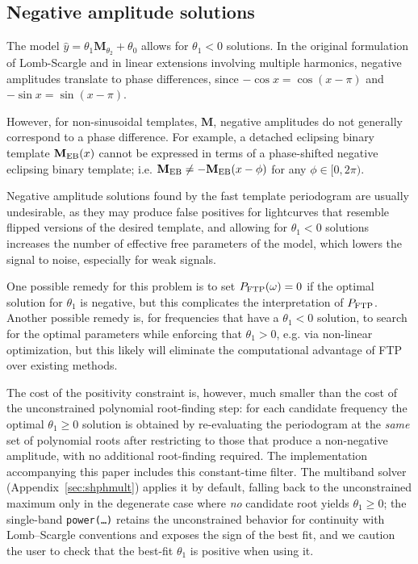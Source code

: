 \documentclass[apj]{emulateapj}
\newcommand{\Mshft}{\mathbf{M}_{\theta_2}}
\begin{document}
\subsection{Negative amplitude solutions}
The model $\hat{y}= \theta_1\Mshft + \theta_0$ allows for $\theta_1 < 0$ solutions.
In the original formulation of Lomb-Scargle and in linear
extensions involving multiple harmonics, negative amplitudes translate to
phase differences, since $-\cos{x} = \cos(x - \pi)$ and $-\sin{x} = \sin(x - \pi)$.

However, for non-sinusoidal templates, $\mathbf{M}$, negative amplitudes
do not generally correspond to a phase difference. For example, a
detached eclipsing binary template $\mathbf{M}_{\rm EB}(x)$ cannot be
expressed in terms of a phase-shifted negative eclipsing binary template; i.e.
$\mathbf{M}_{\rm EB} \neq - \mathbf{M}_{\rm EB}(x - \phi)$ for any $\phi\in[0, 2\pi)$.

Negative amplitude solutions found by the fast template periodogram are usually
undesirable, as they may produce false positives for lightcurves that resemble
flipped versions of the desired template, and allowing for $\theta_1 < 0$ solutions
increases the number of effective free parameters of the model, which lowers
the signal to noise, especially for weak signals.

One possible remedy for this problem is to set $P_{\rm FTP}(\omega) = 0$ if the optimal
solution for $\theta_1$ is negative, but this complicates the interpretation of $P_{\rm FTP}$.
Another possible remedy is, for frequencies that have a $\theta_1 < 0$ solution,
to search for the optimal parameters while enforcing that $\theta_1 > 0$,
e.g. via non-linear optimization, but this likely will eliminate the computational
advantage of FTP over existing methods.

The cost of the positivity constraint is, however, much smaller than
the cost of the unconstrained polynomial root-finding step: for each
candidate frequency the optimal $\theta_1 \geq 0$ solution is obtained
by re-evaluating the periodogram at the \emph{same} set of polynomial
roots after restricting to those that produce a non-negative
amplitude, with no additional root-finding required.  The
implementation accompanying this paper includes this constant-time
filter.  The multiband solver (Appendix~\ref{sec:shphmult}) applies it
by default, falling back to the unconstrained maximum only in the
degenerate case where \emph{no} candidate root yields
$\theta_1 \geq 0$; the single-band \texttt{power(\dots)} retains the
unconstrained behavior for continuity with Lomb--Scargle conventions
and exposes the sign of the best fit, and we caution the user to check
that the best-fit $\theta_1$ is positive when using it.
\end{document}
